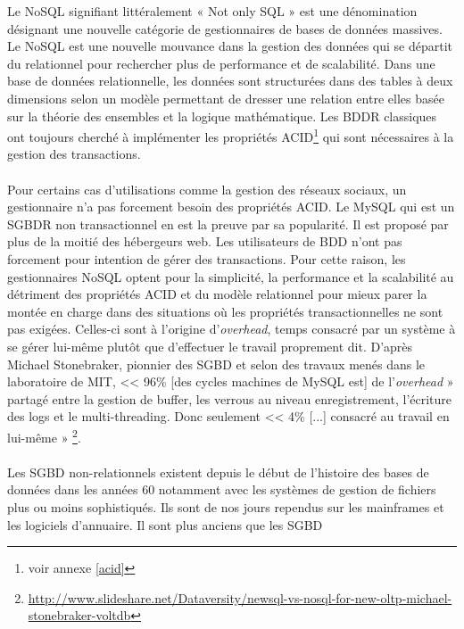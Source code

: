Le \textsf{NoSQL} signifiant littéralement « \textsf{Not only SQL} »
est une dénomination désignant une nouvelle catégorie de gestionnaires
de bases de données massives. Le \textsf{NoSQL} est une nouvelle
mouvance dans la gestion des données qui se départit du relationnel 
pour rechercher plus de performance et de scalabilité. Dans une
base de données relationnelle, les données sont structurées dans des
tables à deux dimensions selon un modèle permettant de dresser une
relation entre elles basée sur la théorie des ensembles et la logique
mathématique. Les \textsf{BDDR} classiques ont toujours cherché à
implémenter les propriétés \textsf{ACID}\footnote{voir annexe
  \ref{acid}} qui sont nécessaires à la gestion des
transactions.  
\\ 
\\ 
Pour certains cas d'utilisations comme la gestion des réseaux sociaux,
un gestionnaire n'a pas forcement besoin des
propriétés \textsf{ACID}. Le
\textsf{MySQL} qui est un \textsf{SGBDR} non transactionnel en est la
preuve par sa popularité. Il est proposé par plus de la moitié des
hébergeurs \textsf{web}. Les utilisateurs de \textsf{BDD} n'ont pas
forcement pour intention de gérer des transactions. Pour cette raison,
les gestionnaires \textsf{NoSQL} optent pour la simplicité, la
performance et la scalabilité au détriment des propriétés
\textsf{ACID} et du modèle relationnel pour mieux parer la montée en
charge dans des situations où les propriétés transactionnelles ne sont
pas exigées. Celles-ci sont à l'origine d'\textit{overhead}, temps
consacré par un système à se gérer lui-même plutôt que d'effectuer le
travail proprement dit. D'après \textsf{Michael Stonebraker}, pionnier
des \textsf{SGBD} et selon des travaux menés dans le laboratoire
de \textsf{MIT}, << 96\% [des cycles machines de \textsf{MySQL} est] de
l’\textit{overhead} » partagé entre la gestion de \textsf{buffer}, les
verrous au niveau enregistrement, l’écriture des \textsf{logs} et
le \textsf{multi-threading}. Donc seulement << 4\% [...] consacré au
travail en lui-même »
\footnote{\url{http://www.slideshare.net/Dataversity/newsql-vs-nosql-for-new-oltp-michael-stonebraker-voltdb}}.
\\ 
\\ 
Les \textsf{SGBD} non-relationnels existent depuis
le début de l'histoire des bases de données dans les années $60$
notamment avec les systèmes de gestion de fichiers plus ou moins
sophistiqués. Ils sont de nos jours rependus sur les mainframes et les
logiciels d'annuaire. Il sont plus anciens que les \textsf{SGBD}

